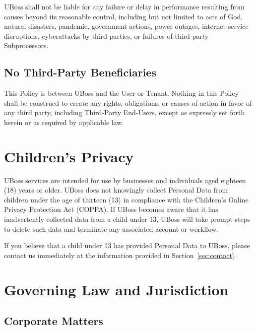 \documentclass[11pt, letterpaper]{article}
\begin{document}
UBoss shall not be liable for any failure or delay in performance resulting from causes
beyond its reasonable control, including but not limited to acts of God, natural
disasters, pandemic, government actions, power outages, internet service disruptions,
cyberattacks by third parties, or failures of third-party Subprocessors.

\subsection{No Third-Party Beneficiaries}

This Policy is between UBoss and the User or Tenant. Nothing in this Policy shall be
construed to create any rights, obligations, or causes of action in favor of any third
party, including Third-Party End-Users, except as expressly set forth herein or as
required by applicable law.

\section{Children's Privacy}

UBoss services are intended for use by businesses and individuals aged eighteen (18)
years or older. UBoss does not knowingly collect Personal Data from children under the
age of thirteen (13) in compliance with the Children's Online Privacy Protection Act
(COPPA). If UBoss becomes aware that it has inadvertently collected data from a child
under 13, UBoss will take prompt steps to delete such data and terminate any associated
account or workflow.

If you believe that a child under 13 has provided Personal Data to UBoss, please
contact us immediately at the information provided in Section~\ref{sec:contact}.

\section{Governing Law and Jurisdiction}

\subsection{Corporate Matters}
\end{document}
